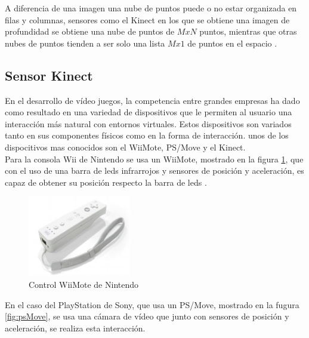         A diferencia de una \gls{imagen} una nube de puntos puede o no estar organizada en filas y columnas, sensores como el Kinect en los que se obtiene una imagen de profundidad se obtiene una nube de puntos de $MxN$ puntos, mientras que otras nubes de puntos tienden a ser solo una lista $Mx1$ de puntos en el espacio \cite{Rusu_ICRA2011_PCL}.\\
        
        
        \subsection{Sensor Kinect}
        
        En el desarrollo de vídeo juegos, la competencia entre grandes empresas ha dado como resultado en una variedad de dispositivos que le permiten al usuario una interacción más natural con entornos virtuales. Estos dispositivos son variados tanto en sus componentes físicos como en la forma de interacción. unos de los dispocitivos mas conocidos son el WiiMote, PS/Move y el Kinect.\\
        
        Para la consola Wii de Nintendo se usa un WiiMote, mostrado en la figura \ref{fig:WiiMote}, que con el uso de una barra de leds infrarrojos y sensores de posición y aceleración, es capaz de obtener su posición respecto la barra de leds \cite{UsodelKi56:online}.\\
        \begin{figure}[!htb]
        	\centering
        	\includegraphics[width=0.4\textwidth]{01Introduccion/imagenes/wiiMote.JPG}
        	\caption{Control WiiMote de Nintendo} 
        	\label{fig:WiiMote}
        \end{figure}
        
        
        En el caso del PlayStation de Sony, que usa un PS/Move, mostrado en la fugura \ref{fig:psMove}, se usa una cámara de vídeo que junto con sensores de posición y aceleración, se realiza esta interacción.\\
        
